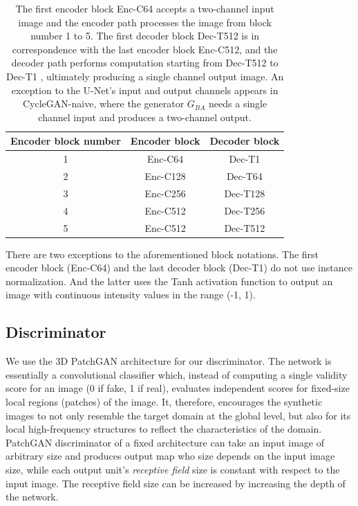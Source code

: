 \begin{table}[h!]
    \centering
    \begin{tabular}{|c|c|c|}
        \hline
        \textbf{Encoder block number} & \textbf{Encoder block} & \textbf{Decoder block} \\
        \hline
        1     & Enc-C64          & Dec-T1           \\
        \hline
        2     & Enc-C128         & Dec-T64          \\
        \hline
        3     & Enc-C256         & Dec-T128         \\
        \hline
        4     & Enc-C512         & Dec-T256         \\
        \hline
        5     & Enc-C512         & Dec-T512         \\
        \hline
    \end{tabular}
    \caption{The first encoder block Enc-C64 accepts a two-channel input image and the encoder path processes the image from block number 1 to 5. The first decoder block Dec-T512 is in correspondence with the last encoder block Enc-C512, and the decoder path performs computation starting from Dec-T512 to Dec-T1 , ultimately producing a single channel output image. An exception to the U-Net's input and output channels appears in CycleGAN-naive, where the generator $G_{BA}$ needs a single channel input and produces a two-channel output.}
    \label{tab:generator_architecture}
\end{table}

There are two exceptions to the aforementioned block notations. The first encoder block (Enc-C64) and the last decoder block (Dec-T1) do not use instance normalization. And the latter uses the Tanh activation function to output an image with continuous intensity values in the range (-1, 1). 


\subsection{Discriminator}
We use the 3D PatchGAN architecture for our discriminator. The network is essentially a convolutional classifier which, instead of computing a single validity score for an image (0 if fake, 1 if real), evaluates independent scores for fixed-size local regions (patches) of the image. It, therefore, encourages the synthetic images to not only resemble the target domain at the global level, but also for its local high-frequency structures to reflect the characteristics of the domain. PatchGAN discriminator of a fixed architecture can take an input image of arbitrary size and produces output map who size depends on the input image size, while each output unit's \textit{receptive field} size is constant with respect to the input image. The receptive field size can be increased by increasing the depth of the network.


